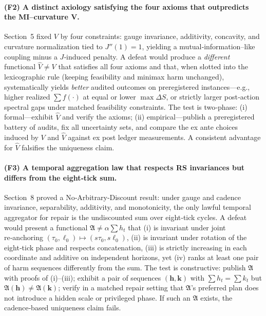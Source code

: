 \documentclass[11pt]{article}
\begin{document}
\paragraph{(F2) A distinct axiology satisfying the four axioms that outpredicts the MI–curvature $\boldsymbol{V}$.}
Section~5 fixed $V$ by four constraints: gauge invariance, additivity, concavity, and curvature normalization tied to $J''(1)=1$, yielding a mutual‑information–like coupling minus a $J$‑induced penalty. A defeat would produce a \emph{different} functional $\widehat V\neq V$ that satisfies all four axioms and that, when slotted into the lexicographic rule (keeping feasibility and minimax harm unchanged), systematically yields \emph{better} audited outcomes on preregistered instances—e.g., higher realized $\sum f(\cdot)$ at equal or lower $\max\Delta S$, or strictly larger post‑action spectral gaps under matched feasibility constraints. The test is two‑phase: (i) formal—exhibit $\widehat V$ and verify the axioms; (ii) empirical—publish a preregistered battery of audits, fix all uncertainty sets, and compare the ex ante choices induced by $V$ and $\widehat V$ against ex post ledger measurements. A consistent advantage for $\widehat V$ falsifies the uniqueness claim.

\paragraph{(F3) A temporal aggregation law that respects RS invariances but differs from the eight‑tick sum.}
Section~8 proved a No‑Arbitrary‑Discount result: under gauge and cadence invariance, separability, additivity, and monotonicity, the only lawful temporal aggregator for repair is the undiscounted sum over eight‑tick cycles. A defeat would present a functional $\mathfrak{A}\neq \alpha\sum h_t$ that (i) is invariant under joint re‑anchoring $(\tau_0,\ell_0)\mapsto(s\tau_0,s\ell_0)$, (ii) is invariant under rotation of the eight‑tick phase and respects concatenation, (iii) is strictly increasing in each coordinate and additive on independent horizons, yet (iv) ranks at least one pair of harm sequences differently from the sum. The test is constructive: publish $\mathfrak{A}$ with proofs of (i)–(iii); exhibit a pair of sequences $(\mathbf{h},\mathbf{k})$ with $\sum h_t=\sum k_t$ but $\mathfrak{A}(\mathbf{h})\neq\mathfrak{A}(\mathbf{k})$; verify in a matched repair setting that $\mathfrak{A}$’s preferred plan does not introduce a hidden scale or privileged phase. If such an $\mathfrak{A}$ exists, the cadence‑based uniqueness claim fails.
\end{document}
